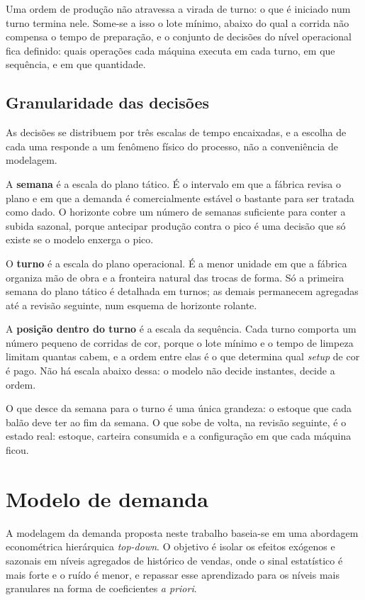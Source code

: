 \documentclass[fleqn,12pt,a4paper]{article}
\begin{document}
Uma ordem de produção não atravessa a virada de turno: o que é iniciado num turno termina nele. Some-se a isso o lote mínimo, abaixo do qual a corrida não compensa o tempo de preparação, e o conjunto de decisões do nível operacional fica definido: quais operações cada máquina executa em cada turno, em que sequência, e em que quantidade.

\subsection{Granularidade das decisões}

As decisões se distribuem por três escalas de tempo encaixadas, e a escolha de cada uma responde a um fenômeno físico do processo, não a conveniência de modelagem.

A \textbf{semana} é a escala do plano tático. É o intervalo em que a fábrica revisa o plano e em que a demanda é comercialmente estável o bastante para ser tratada como dado. O horizonte cobre um número de semanas suficiente para conter a subida sazonal, porque antecipar produção contra o pico é uma decisão que só existe se o modelo enxerga o pico.

O \textbf{turno} é a escala do plano operacional. É a menor unidade em que a fábrica organiza mão de obra e a fronteira natural das trocas de forma. Só a primeira semana do plano tático é detalhada em turnos; as demais permanecem agregadas até a revisão seguinte, num esquema de horizonte rolante.

A \textbf{posição dentro do turno} é a escala da sequência. Cada turno comporta um número pequeno de corridas de cor, porque o lote mínimo e o tempo de limpeza limitam quantas cabem, e a ordem entre elas é o que determina qual \textit{setup} de cor é pago. Não há escala abaixo dessa: o modelo não decide instantes, decide a ordem.

O que desce da semana para o turno é uma única grandeza: o estoque que cada balão deve ter ao fim da semana. O que sobe de volta, na revisão seguinte, é o estado real: estoque, carteira consumida e a configuração em que cada máquina ficou.

\newpage

\section{Modelo de demanda}
\label{sec:modelo_demanda}

A modelagem da demanda proposta neste trabalho baseia-se em uma abordagem econométrica hierárquica \textit{top-down}. O objetivo é isolar os efeitos exógenos e sazonais em níveis agregados de histórico de vendas, onde o sinal estatístico é mais forte e o ruído é menor, e repassar esse aprendizado para os níveis mais granulares na forma de coeficientes \textit{a priori}. 
\end{document}
